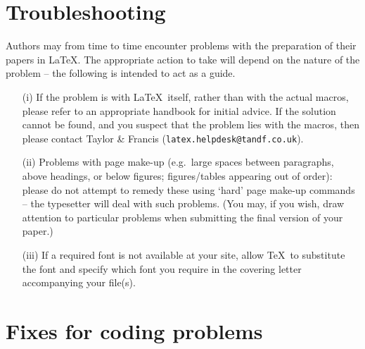 \documentclass{gCMB2e}
\begin{document}
\section{Troubleshooting}

Authors may from time to time encounter problems with the  preparation
of their papers in \LaTeX\/. The appropriate  action  to
take will depend on the nature of the problem -- the following is
intended to act as a guide.
%
\begin{enumerate}
\item[(i)] If the problem is with \LaTeX\ itself, rather than with the
actual macros, please refer to an appropriate handbook for
initial advice. If the solution cannot be found, and you
suspect that the problem lies with the macros, then please contact
Taylor \& Francis ({\tt latex.helpdesk@tandf.co.uk}).

\item[(ii)] Problems with page make-up (e.g.\ large spaces between paragraphs, 
above headings, or below figures; figures/tables appearing out of order): 
please do not attempt to remedy these using `hard' page make-up 
commands -- the typesetter will deal with such problems. (You may, if you 
wish, draw attention to particular problems when submitting the final version 
of your paper.)

\item[(iii)] If a required font is not available at your site, allow \TeX\
to substitute the font and specify which font you require in the
covering letter accompanying your file(s).
\end{enumerate}


\section{Fixes for coding problems}
\end{document}
